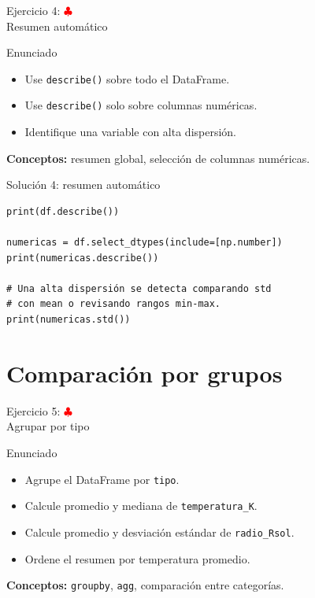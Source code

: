 \documentclass[10pt]{beamer}
\begin{document}
\begin{frame}{Ejercicio 4: \hfill \textcolor{red}{$\clubsuit$} \\ Resumen automático}
  \begin{block}{Enunciado}
    \begin{itemize}
      \item Use \texttt{describe()} sobre todo el DataFrame.
      \item Use \texttt{describe()} solo sobre columnas numéricas.
      \item Identifique una variable con alta dispersión.
    \end{itemize}
  \end{block}
  \textbf{Conceptos:} resumen global, selección de columnas numéricas.
\end{frame}

\begin{solutionblock}
\begin{frame}[fragile]{Solución 4: resumen automático}
\begin{verbatim}
print(df.describe())

numericas = df.select_dtypes(include=[np.number])
print(numericas.describe())

# Una alta dispersión se detecta comparando std
# con mean o revisando rangos min-max.
print(numericas.std())
\end{verbatim}
\end{frame}
\end{solutionblock}

\section{Comparación por grupos}

\begin{frame}{Ejercicio 5: \hfill \textcolor{red}{$\clubsuit$} \\ Agrupar por tipo}
  \begin{block}{Enunciado}
    \begin{itemize}
      \item Agrupe el DataFrame por \texttt{tipo}.
      \item Calcule promedio y mediana de \texttt{temperatura\_K}.
      \item Calcule promedio y desviación estándar de \texttt{radio\_Rsol}.
      \item Ordene el resumen por temperatura promedio.
    \end{itemize}
  \end{block}
  \textbf{Conceptos:} \texttt{groupby}, \texttt{agg}, comparación entre categorías.
\end{frame}
\end{document}

